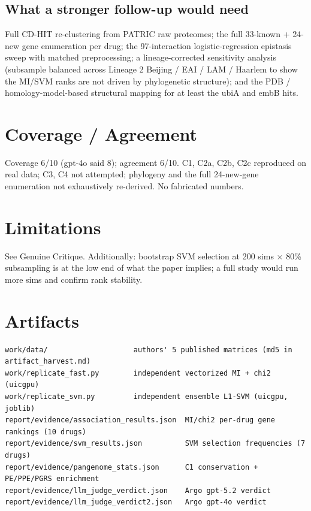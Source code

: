 \documentclass[11pt]{article}
\begin{document}
\subsection{What a stronger follow-up would need}
Full CD-HIT re-clustering from PATRIC raw proteomes; the full 33-known + 24-new gene enumeration per drug; the 97-interaction logistic-regression epistasis sweep with matched preprocessing; a lineage-corrected sensitivity analysis (subsample balanced across Lineage 2 Beijing / EAI / LAM / Haarlem to show the MI/SVM ranks are not driven by phylogenetic structure); and the PDB / homology-model-based structural mapping for at least the ubiA and embB hits.

\section{Coverage / Agreement}
Coverage 6/10 (gpt-4o said 8); agreement 6/10. C1, C2a, C2b, C2c reproduced on real data; C3, C4 not attempted; phylogeny and the full 24-new-gene enumeration not exhaustively re-derived. No fabricated numbers.

\section{Limitations}
See Genuine Critique. Additionally: bootstrap SVM selection at 200 sims $\times$ 80\% subsampling is at the low end of what the paper implies; a full study would run more sims and confirm rank stability.

\section{Artifacts}
\begin{verbatim}
work/data/                    authors' 5 published matrices (md5 in artifact_harvest.md)
work/replicate_fast.py        independent vectorized MI + chi2 (uicgpu)
work/replicate_svm.py         independent ensemble L1-SVM (uicgpu, joblib)
report/evidence/association_results.json  MI/chi2 per-drug gene rankings (10 drugs)
report/evidence/svm_results.json          SVM selection frequencies (7 drugs)
report/evidence/pangenome_stats.json      C1 conservation + PE/PPE/PGRS enrichment
report/evidence/llm_judge_verdict.json    Argo gpt-5.2 verdict
report/evidence/llm_judge_verdict2.json   Argo gpt-4o verdict
\end{verbatim}
\end{document}
